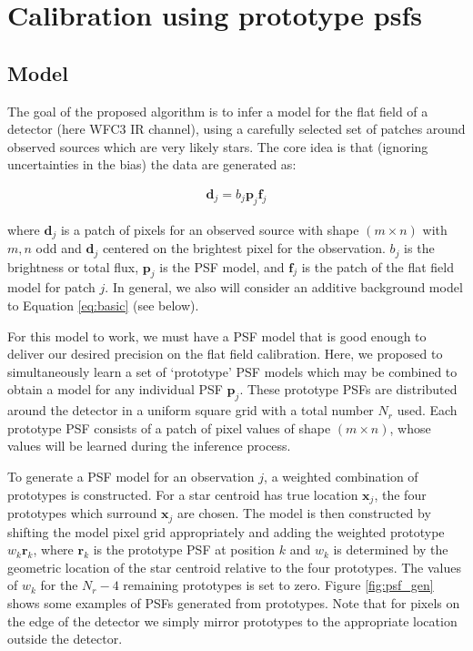 \documentclass[12pt,preprint,pdftex]{aastex}
\newcommand{\vc}[1]{\mathbf{#1}}
\begin{document}
\sloppy\sloppypar



\section{Calibration using prototype psfs}

\subsection{Model}

The goal of the proposed algorithm is to infer a model for the flat field of a detector (here 
WFC3 IR channel), using a carefully selected set of patches around observed sources 
which are very likely stars.  The core idea is that (ignoring uncertainties in the bias) the 
data are generated as:

\begin{eqnarray}
\vc{d}_j = b_j \vc{p}_j \vc{f}_j
\label{eq:basic}
\end{eqnarray}

\noindent where $\vc{d}_j$ is a patch of pixels for an observed source with shape 
$(m \times n)$ with $m, n$ odd and $\vc{d}_j$ centered on the brightest pixel for the 
observation.  $b_j$ is the brightness or total flux, $\vc{p}_j$ is the PSF model, and 
$\vc{f}_j$ is the patch of the flat field model for patch $j$.  In general, we also will 
consider an additive background model to Equation \ref{eq:basic} (see below).  

For this model to work, we must have a PSF model that is good enough to deliver our 
desired precision on the flat field calibration.  Here, we proposed to simultaneously 
learn a set of `prototype' PSF models which may be combined to obtain a model for any 
individual PSF $\vc{p}_j$.  These prototype PSFs are distributed around the detector 
in a uniform square grid with a total number $N_r$ used.  Each prototype 
PSF consists of a patch of pixel values of shape $(m \times n)$, whose values will be 
learned during the inference process.

To generate a PSF model for an observation $j$, a weighted combination of prototypes 
is constructed.  For a star centroid has true location $\vc{x}_j$, the four 
prototypes which surround $\vc{x}_j$ are chosen.  The model is then constructed by 
shifting the model pixel grid appropriately and adding the weighted prototype 
$w_k \vc{r}_k$, where $\vc{r}_k$ is the prototype PSF at position $k$ and $w_k$ is 
determined by the geometric location of the star centroid relative to the four prototypes.  
The values of $w_k$ for the $N_r - 4$ remaining prototypes is set to zero.
Figure \ref{fig:psf_gen} shows some examples of PSFs generated from prototypes.  Note 
that for pixels on the edge of the detector we simply mirror prototypes to the appropriate 
location outside the detector.
\end{document}
